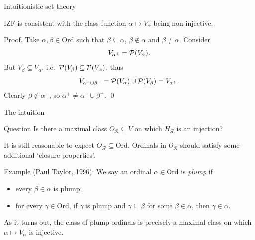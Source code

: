 \documentclass{beamer}
\newcommand{\IZF}{\mathrm{IZF}}
\newcommand{\Ord}{\mathrm{Ord}}
\newcommand{\exampletext}[1]{\textcolor{green!50!black}{#1}}
\begin{document}
\begin{frame}{Intuitionistic set theory}
  \begin{corollary}
    $\IZF$ is consistent with the class function $\alpha \mapsto V_\alpha$ being non-injective.
  \end{corollary}

  \vspace{0.4em}

  \exampletext{Proof.} Take $\alpha, \beta \in \Ord$ such that $\beta \subseteq \alpha$, $\beta \not\in \alpha$ and $\beta \neq \alpha$. Consider
  \[V_{\alpha^+} = \mathcal{P}\mleft(V_\alpha\mright).\]
  But $V_\beta \subseteq V_\alpha$, i.e.\ $\mathcal{P}\mleft(V_\beta\mright) \subseteq \mathcal{P}\mleft(V_\alpha\mright)$, thus
  \[V_{\alpha^+ \cup \beta^+} = \mathcal{P}\mleft(V_\alpha\mright) \cup \mathcal{P}\mleft(V_\beta\mright) = V_{\alpha^+}.\]
  Clearly $\beta \not\in \alpha^+$, so $\alpha^+ \neq \alpha^+ \cup \beta^+$. \qed
\end{frame}

\begin{frame}{The intuition}
  \begin{block}{Question}
    Is there a maximal class $O_\mathscr{R} \subseteq V$ on which $H_\mathscr{R}$ is an injection?
  \end{block}

  \vspace{0.4em}

  It is still reasonable to expect $O_\mathscr{R} \subseteq \Ord$. Ordinals in $O_\mathscr{R}$ should satisfy some additional `closure properties'.

  \pause

  \vspace{1em}

  \exampletext{Example (Paul Taylor, 1996\nocite{taylor96-intuitionistic-ordinals})}: We say an ordinal $\alpha \in \Ord$ is \emph{plump} if
  \begin{itemize}
    \item every $\beta \in \alpha$ is plump;
    \item for every $\gamma \in \Ord$, if $\gamma$ is plump and $\gamma \subseteq \beta$ for some $\beta \in \alpha$, then $\gamma \in \alpha$.
  \end{itemize}

  As it turns out, the class of plump ordinals is precisely a maximal class on which $\alpha \mapsto V_\alpha$ is injective.
\end{frame}
\end{document}
